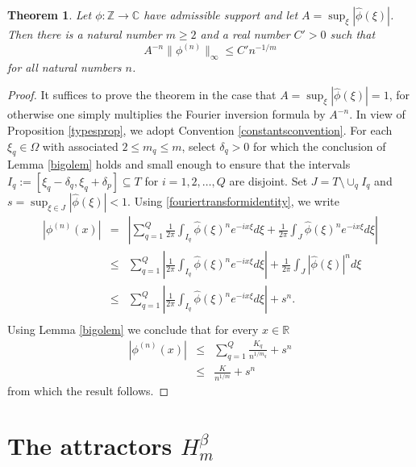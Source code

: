 \documentclass{article}
\theoremstyle{theorem}
\newtheorem{theorem}{Theorem}[section]
\theoremstyle{remark}
\begin{document}
\begin{theorem}\label{firsthalfmainbound}
Let $\phi:\mathbb{Z}\rightarrow \mathbb{C}$ have admissible support and let $A=\sup_\xi|\hat{\phi}(\xi)|$. Then there is a
natural number $m\geq 2$ and a real number $C'>0$ such that 
\begin{equation}\label{upperboundsup}
 A^{-n}\|\phi^{(n)}\|_{\infty}\leq C' n^{-1/m}
\end{equation}
for all natural numbers $n$.
\end{theorem}

\begin{proof}
It suffices to prove the theorem in the case that $A=\sup_{\xi}|\hat{\phi}(\xi)|=1$, for otherwise one simply
multiplies the Fourier inversion formula by $A^{-n}$. In view of Proposition \ref{typesprop}, we adopt Convention \ref{constantsconvention}. For each $\xi_q\in\Omega$ with associated $2\leq m_q\leq m$, select $\delta_q>0$ for which the conclusion of Lemma \ref{bigolem} holds and small enough to ensure that the intervals $I_q:=[\xi_q-\delta_q,\xi_q+\delta_p]\subseteq T$ for $i=1,2,\dots,Q$ are disjoint. Set $J=T\setminus \cup_q I_q$ and $s=\sup_{\xi\in J}|\hat{\phi}(\xi)|<1$. Using \eqref{fouriertransformidentity}, we write
\begin{eqnarray*}
|\phi^{(n)}(x)|&=& \left|\sum_{q=1}^Q \frac{1}{2\pi}\int_{I_q} \hat{\phi}(\xi)^n e^{-ix\xi}d\xi+ \frac{1}{2\pi}\int_J \hat{\phi}(\xi)^n e^{-ix\xi}d\xi\right|\\
&\leq&\sum_{q=1}^Q \left|\frac{1}{2\pi}\int_{I_q} \hat{\phi}(\xi)^n e^{-ix\xi}d\xi\right|+ \frac{1}{2\pi}\int_J | \hat{\phi}(\xi)|^n d\xi\\
&\leq&\sum_{q=1}^Q \left|\frac{1}{2\pi}\int_{I_q} \hat{\phi}(\xi)^n e^{-ix\xi}d\xi\right|+ s^n.\\
\end{eqnarray*}
Using Lemma \ref{bigolem} we conclude that for every $x\in\mathbb{R}$
\begin{eqnarray*}
|\phi^{(n)}(x)|&\leq&\sum_{q=1}^Q \frac{K_q}{n^{1/m_q}}+s^n\\
&\leq& \frac{K}{n^{1/m}}+s^n
\end{eqnarray*} 
from which the result follows.
\end{proof}




\section{The attractors $H_m^{\beta}$}\label{attractorsec}
\end{document}
